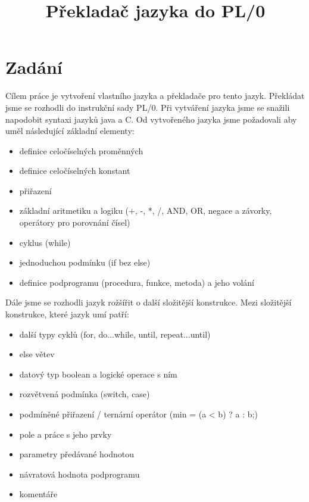 \documentclass[czech]{thesiskiv}
\title{Překladač jazyka do PL/0}
\begin{document}
%
\maketitle
\thispagestyle{empty} 
\pagestyle{empty}
\tableofcontents
{}

\chapter{Zadání}
\label{sec:zadani}
\pagestyle{plain}
\setcounter{page}{1}
Cílem práce je vytvoření vlastního jazyka a překladače pro tento jazyk.
Překládat jsme se rozhodli do instrukční sady PL/0.
Při vytváření jazyka jsme se snažili napodobit syntaxi jazyků java a C.
Od vytvořeného jazyka jsme požadovali aby uměl následující základní elementy:

\begin{itemize}
\item definice celočíselných proměnných
\item definice celočíselných konstant
\item přiřazení
\item základní aritmetiku a logiku (+, -, *, /, AND, OR, negace a závorky, operátory pro porovnání čísel)
\item cyklus (while)
\item jednoduchou podmínku (if bez else)
\item definice podprogramu (procedura, funkce, metoda) a jeho volání
\end{itemize}

\noindent Dále jsme se rozhodli jazyk rožšířit o další složitější konstrukce.
Mezi složitější konstrukce, které jazyk umí patří:

\begin{itemize}
\item další typy cyklů (for, do...while, until, repeat...until)
\item else větev
\item datový typ boolean a logické operace s ním
\item rozvětvená podmínka (switch, case)
\item podmíněné přiřazení / ternární operátor (min = (a < b) ? a : b;)
\item pole a práce s jeho prvky
\item parametry předávané hodnotou
\item návratová hodnota podprogramu
\item komentáře
\end{itemize}
\end{document}
